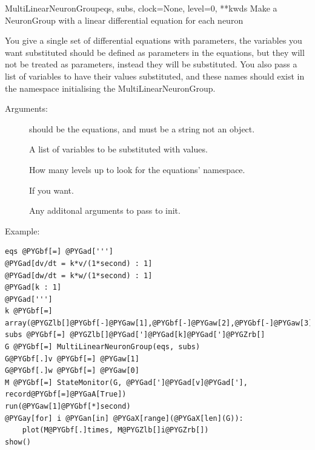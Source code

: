 \documentclass[letterpaper,10pt,english]{manual}
\begin{document}
\hypertarget{brian.experimental.multilinearstateupdater.MultiLinearNeuronGroup}{}\begin{classdesc}{MultiLinearNeuronGroup}{eqs, subs, clock=None, level=0, **kwds}
Make a NeuronGroup with a linear differential equation for each neuron

You give a single set of differential equations with parameters, the
variables you want substituted should be defined as parameters in the equations,
but they will not be treated as parameters, instead they will be substituted.
You also pass a list of variables to have their values substituted, and these
names should exist in the namespace initialising the MultiLinearNeuronGroup.

Arguments:
\begin{description}
\item[]
should be the equations, and must be a string not an  object.

\item[]
A list of variables to be substituted with values.

\item[]
How many levels up to look for the equations' namespace.

\item[]
If you want.

\item[]
Any additonal arguments to pass to  init.

\end{description}
\end{classdesc}

Example:

\begin{Verbatim}[commandchars=@\[\]]
eqs @PYGbf[=] @PYGad[''']
@PYGad[dv/dt = k*v/(1*second) : 1]
@PYGad[dw/dt = k*w/(1*second) : 1]
@PYGad[k : 1]
@PYGad[''']
k @PYGbf[=] array(@PYGZlb[]@PYGbf[-]@PYGaw[1],@PYGbf[-]@PYGaw[2],@PYGbf[-]@PYGaw[3]@PYGZrb[])
subs @PYGbf[=] @PYGZlb[]@PYGad[']@PYGad[k]@PYGad[']@PYGZrb[]
G @PYGbf[=] MultiLinearNeuronGroup(eqs, subs)
G@PYGbf[.]v @PYGbf[=] @PYGaw[1]
G@PYGbf[.]w @PYGbf[=] @PYGaw[0]
M @PYGbf[=] StateMonitor(G, @PYGad[']@PYGad[v]@PYGad['], record@PYGbf[=]@PYGaA[True])
run(@PYGaw[1]@PYGbf[*]second)
@PYGay[for] i @PYGan[in] @PYGaX[range](@PYGaX[len](G)):
    plot(M@PYGbf[.]times, M@PYGZlb[]i@PYGZrb[])
show()
\end{Verbatim}

\resetcurrentobjects
\hypertarget{--doc-developer}{}
\end{document}

